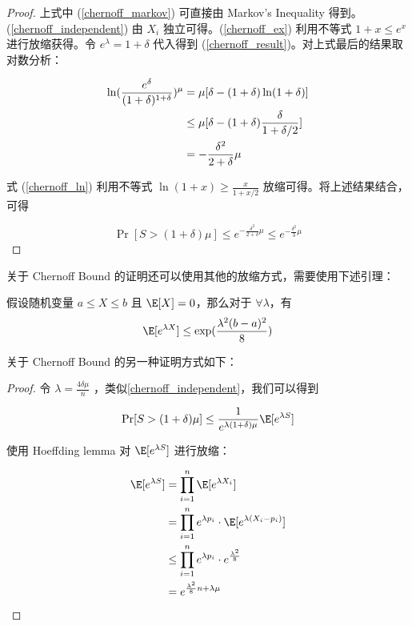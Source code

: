 \documentclass[lang=cn,newtx,10pt,scheme=chinese,chinesefont=nofont,citestyle=gb7714-2015, bibstyle=gb7714-2015]{elegantbook}
\begin{document}
\begin{refsection}
\begin{proof}
上式中 (\cref{chernoff_markov}) 可直接由 Markov's Inequality 得到。(\cref{chernoff_independent}) 由 $X_i$ 独立可得。(\ref{chernoff_ex}) 利用不等式 $1+x\le e^x$ 进行放缩获得。令 $e^\lambda=1+\delta$ 代入得到 (\cref{chernoff_result})。对上式最后的结果取对数分析：

\begin{align}
    \ln (\frac{e^\delta}{(1+\delta)^{1+\delta}})^\mu &= \mu[\delta - (1+\delta)\ln(1+\delta)] \notag \\
    &\le \mu[\delta - (1+\delta)\frac{\delta}{1+\delta/2}] \label{chernoff_ln} \\
    &= -\frac{\delta^2}{2+\delta}\mu \notag
\end{align}

式 (\ref{chernoff_ln}) 利用不等式 $\ln(1+x)\ge\frac{x}{1+x/2}$ 放缩可得。将上述结果结合，可得

\begin{equation*}
    \Pr[S>(1+\delta)\mu] \le e^{-\frac{\delta^2}{2+\delta}\mu} \le e^{-\frac{\delta^2}{3}\mu}
\end{equation*}
\end{proof}

关于 Chernoff Bound 的证明还可以使用其他的放缩方式，需要使用下述引理：

\begin{lemma}
    假设随机变量 $a\le X\le b$ 且 $\E[X]=0$，那么对于 $\forall\lambda$，有
    \begin{equation*}
        \E[e^{\lambda X}]\le \exp(\frac{\lambda^2(b-a)^2}{8})
    \end{equation*}
\end{lemma}

关于 Chernoff Bound 的另一种证明方式如下：
\begin{proof}

令 $\lambda=\frac{4\delta\mu}{n}$ ，类似\cref{chernoff_independent}，我们可以得到

\begin{equation*}
    \Pr[S>(1+\delta)\mu] \le \frac{1}{e^{\lambda(1+\delta)\mu}}\E[e^{\lambda S}]
\end{equation*}

使用 Hoeffding lemma 对 $\E[e^{\lambda S}]$ 进行放缩：

\begin{align}
    \E[e^{\lambda S}] &= \prod_{i=1}^n \E[e^{\lambda X_i}] \notag \\
    &= \prod_{i=1}^n e^{\lambda p_i}\cdot\E[e^{\lambda(X_i-p_i)}] \notag \\
    &\le \prod_{i=1}^n e^{\lambda p_i} \cdot e^{\frac{\lambda^2}{8}} \label{chernoff_h_lemmal} \\
    &= e^{\frac{\lambda^2}{8}n+\lambda\mu} \notag
\end{align}


\end{proof}
\end{refsection}
\end{document}

